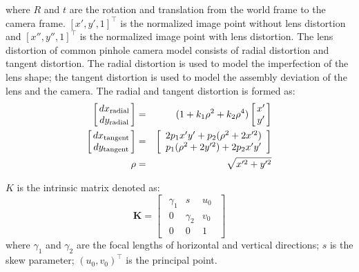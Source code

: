 \documentclass{report}
\begin{document}
where $R$ and $t$ are the rotation and translation from the world frame to the camera frame. $[x', y', 1]^\top$ is the normalized image point without lens distortion and $[x'', y'', 1]^\top$ is the normalized image point with lens distortion. The lens distortion of common pinhole camera model consists of radial distortion and tangent distortion. The radial distortion is used to model the imperfection of the lens shape; the tangent distortion is used to model the assembly deviation of the lens and the camera. The radial and tangent distortion is formed as: 
\begin{eqnarray}
\arraycolsep=1.5pt%
\begin{bmatrix}
	\begin{array}{c}
	dx_{\text{radial}} \\ dy_{\text{radial}}
	\end{array}
\end{bmatrix} 
&=&
(1 + k_1 \rho^2 + k_2 \rho^4) 
\arraycolsep=1.5pt%
\begin{bmatrix}
	\begin{array}{c}
	x' \\ y'
	\end{array}
\end{bmatrix} \\
\arraycolsep=1.5pt%
\begin{bmatrix}
	\begin{array}{c}
	dx_{\text{tangent}} \\ dy_{\text{tangent}}
	\end{array}
\end{bmatrix} 
&=&
\begin{bmatrix}
	\begin{array}{c}
	2 p_1 x' y' + p_2 (\rho^2 + 2 x'^2) \\ 
	p_1 (\rho^2 + 2 y'^2) + 2 p_2 x' y'
	\end{array}
\end{bmatrix} \\
\rho &=& \sqrt{x'^2 + y'^2}
\end{eqnarray}

$K$ is the intrinsic matrix denoted as: 
\begin{equation}
\mathbf{K} = 
\begin{bmatrix}
	\begin{array}{ccc}
	\gamma_1 & s & u_0 \\ 
	0 & \gamma_2 & v_0 \\ 	
	0 & 0 & 1
	\end{array}
\end{bmatrix}
\label{kEqn}
\end{equation}
where $\gamma_1$ and $\gamma_2$ are the focal lengths of horizontal and vertical directions; $s$ is the skew parameter; $(u_0, v_0)^\top$ is the principal point. 
\end{document}
